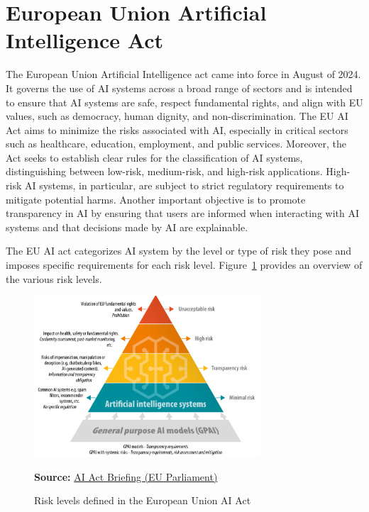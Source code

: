 \section{European Union Artificial Intelligence Act}

The European Union Artificial Intelligence act came into force in August of 2024. It governs the use of AI systems across a broad range of sectors and is intended to ensure that AI systems are safe, respect fundamental rights, and align with EU values, such as democracy, human dignity, and non-discrimination. The EU AI Act aims to minimize the risks associated with AI, especially in critical sectors such as healthcare, education, employment, and public services. Moreover, the Act seeks to establish clear rules for the classification of AI systems, distinguishing between low-risk, medium-risk, and high-risk applications. High-risk AI systems, in particular, are subject to strict regulatory requirements to mitigate potential harms. Another important objective is to promote transparency in AI by ensuring that users are informed when interacting with AI systems and that decisions made by AI are explainable.

The EU AI act categorizes AI system by the level or type of risk they pose and imposes specific requirements for each risk level. Figure~\ref{fig:euaiact} provides an overview of the various risk levels.

\begin{figure}
\centering
\includegraphics[width=0.75\textwidth]{screen2.png}

\vspace{\baselineskip}
\scriptsize \textbf{Source:} \href{https://www.europarl.europa.eu/RegData/etudes/BRIE/2021/698792/EPRS_BRI(2021)698792_EN.pdf}{AI Act Briefing (EU Parliament)}
\caption{Risk levels defined in the European Union AI Act}
\label{fig:euaiact}
\end{figure}

